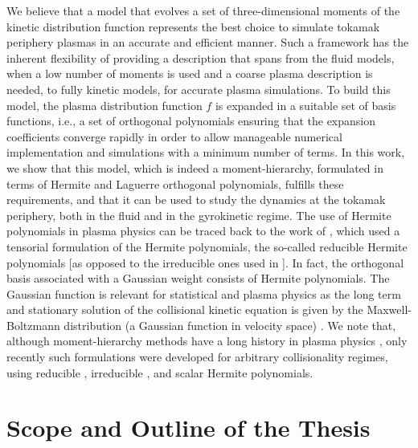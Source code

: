 We believe that a model that evolves a set of three-dimensional moments of the kinetic distribution function represents the best choice to simulate tokamak periphery plasmas in an accurate and efficient manner.
%
Such a framework has the inherent flexibility of providing a description that spans from the fluid models, when a low number of moments is used and a coarse plasma description is needed, to fully kinetic models, for accurate plasma simulations.
%
To build this model, the plasma distribution function $f$ is expanded in a suitable set of basis functions, i.e., a set of orthogonal polynomials ensuring that the expansion coefficients converge rapidly in order to allow manageable numerical implementation and simulations with a minimum number of terms.
%
In this work, we show that this model, which is indeed a moment-hierarchy, formulated in terms of Hermite and Laguerre orthogonal polynomials, fulfills these requirements, and that it can be used to study the dynamics at the tokamak periphery, both in the fluid and in the gyrokinetic regime.
%
The use of Hermite polynomials in plasma physics can be traced back to the work of \citet{Grad1963}, which used a tensorial formulation of the Hermite polynomials, the so-called reducible Hermite polynomials [as opposed to the irreducible ones used in \citet{Balescu1988}].
%
In fact, the orthogonal basis associated with a Gaussian weight consists of Hermite polynomials.
%
The Gaussian function is relevant for statistical and plasma physics as the long term and stationary solution of the collisional kinetic equation is given by the Maxwell-Boltzmann distribution (a Gaussian function in velocity space) \citep{Helander2002}.
%
We note that, although moment-hierarchy methods have a long history in plasma physics \citep{Grad1963,Braginskii1965,Balescu1988}, only recently such formulations were developed for arbitrary collisionality regimes, using reducible \citep{Hirvijoki2016}, irreducible \citep{Ji2009}, and scalar \citep{Jorge2017} Hermite polynomials.

\section{Scope and Outline of the Thesis}

